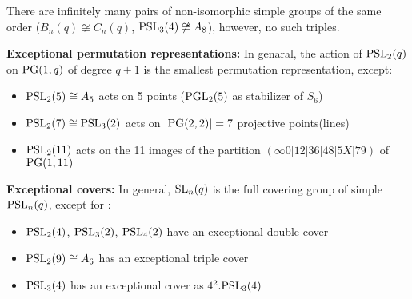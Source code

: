\documentclass[a4paper,11pt]{article}
\begin{document}
\begin{proposition}
    There are infinitely many pairs of non-isomorphic simple
groups of the same order ($B_n(q) \not\cong C_n(q)$, $\mathrm{PSL}_3(4) \not\cong A_8$), however, no such triples.
\end{proposition}



\noindent\textbf{Exceptional permutation representations:}
In genaral, the action of
$\mathrm{PSL}_2(q)$ on $\mathrm{PG}(1,q)$ of degree $q + 1$ is the smallest permutation representation, except:
\begin{itemize}
    \item $\mathrm{PSL}_2(5)\cong A_5$ acts on 5 points ($\mathrm{PGL}_2(5)$ as stabilizer of $S_6$)
    \item $\mathrm{PSL}_2(7)\cong \mathrm{PSL}_3(2)$ acts on $|\mathrm{PG}(2,2)|=7$ projective points(lines)
    \item $\mathrm{PSL}_2(11)$ acts on the 11 images of the partition $(\infty 0|12|36|48|5X|79)$ of $\mathrm{PG}(1, 11)$
\end{itemize}




\noindent\textbf{Exceptional covers:}
In general, $\mathrm{SL}_n(q)$ is the full covering group of simple $\mathrm{PSL}_n(q)$, except for :
\begin{itemize}
    \item $\mathrm{PSL}_2(4)$, $\mathrm{PSL}_3(2)$, $\mathrm{PSL}_4(2)$ have an exceptional double cover
    \item $\mathrm{PSL}_2(9)\cong A_6$ has an exceptional triple cover
    \item $\mathrm{PSL}_3(4)$ has an exceptional cover as $4^2.\mathrm{PSL}_3(4)$
\end{itemize}


\ifx\ChapThreeSecThree\undefined %
     
\end{document}
